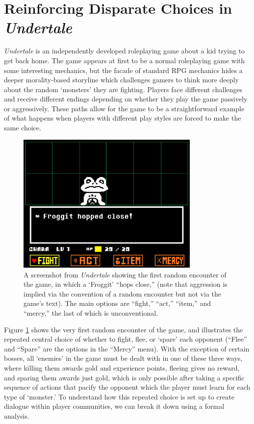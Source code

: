 \documentclass[arts,article,submit,moreauthors,pdftex,10pt,a4paper]{Definitions/mdpi}
\begin{document}
\section{Reinforcing Disparate Choices in \emph{Undertale}}

\emph{Undertale} is an independently developed roleplaying game \citep{fox2015undertale} about a kid trying to get back home.
%
The game appears at first to be a normal roleplaying game with some interesting mechanics, but the facade of standard RPG mechanics hides a deeper morality-based storyline which challenges gamers to think more deeply about the random `monsters' they are fighting.
%
Players face different challenges and receive different endings depending on whether they play the game passively or aggressively.
%
These paths allow for the game to be a straightforward example of what happens when players with different play styles are forced to make the same choice.

\begin{figure}[t]
  \centering
    \includegraphics[width=0.8\textwidth]{fig/froggit.png}
    \caption{A screenshot from \emph{Undertale} showing the first random encounter of the game, in which a `Froggit' ``hops close,'' (note that aggression is implied via the convention of a random encounter but not via the game's text). The main options are ``fight,'' ``act,'' ``item,'' and ``mercy,'' the last of which is unconventional.}
    \label{fig:UT_froggit}
\end{figure}

Figure \ref{fig:UT_froggit} shows the very first random encounter of the game, and illustrates the repeated central choice of whether to fight, flee, or `spare' each opponent (``Flee'' and ``Spare'' are the options in the ``Mercy'' menu).
%
With the exception of certain bosses, all `enemies' in the game must be dealt with in one of these three ways, where killing them awards gold and experience points, fleeing gives no reward, and sparing them awards just gold, which is only possible after taking a specific sequence of actions that pacify the opponent which the player must learn for each type of `monster.'
%
To understand how this repeated choice is set up to create dialogue within player communities, we can break it down using a formal analysis.
\end{document}
